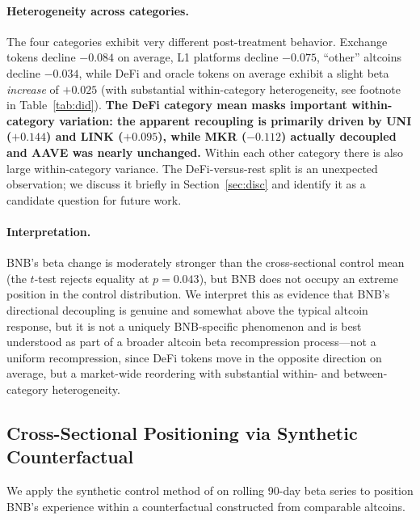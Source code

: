\documentclass[11pt,a4paper]{article}
\begin{document}
\paragraph{Heterogeneity across categories.} The four categories exhibit very different post-treatment behavior. Exchange tokens decline $-0.084$ on average, L1 platforms decline $-0.075$, ``other'' altcoins decline $-0.034$, while DeFi and oracle tokens on average exhibit a slight beta \emph{increase} of $+0.025$ (with substantial within-category heterogeneity, see footnote in Table~\ref{tab:did}). \textbf{The DeFi category mean masks important within-category variation: the apparent recoupling is primarily driven by UNI ($+0.144$) and LINK ($+0.095$), while MKR ($-0.112$) actually decoupled and AAVE was nearly unchanged.} Within each other category there is also large within-category variance. The DeFi-versus-rest split is an unexpected observation; we discuss it briefly in Section~\ref{sec:disc} and identify it as a candidate question for future work.

\paragraph{Interpretation.} BNB's beta change is moderately stronger than the cross-sectional control mean (the $t$-test rejects equality at $p=0.043$), but BNB does not occupy an extreme position in the control distribution. We interpret this as evidence that BNB's directional decoupling is genuine and somewhat above the typical altcoin response, but it is not a uniquely BNB-specific phenomenon and is best understood as part of a broader altcoin beta recompression process---not a uniform recompression, since DeFi tokens move in the opposite direction on average, but a market-wide reordering with substantial within- and between-category heterogeneity.

\subsection{Cross-Sectional Positioning via Synthetic Counterfactual} \label{sec:synth}

We apply the synthetic control method of \citet{abadie2010} on rolling 90-day beta series to position BNB's experience within a counterfactual constructed from comparable altcoins.
\end{document}

